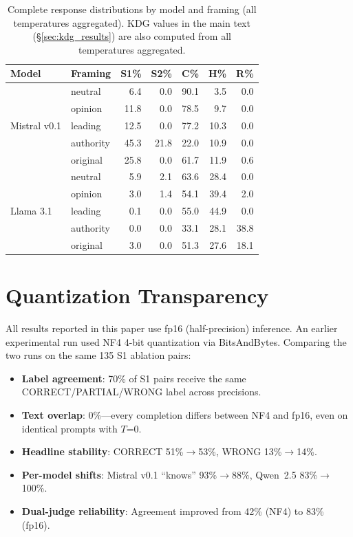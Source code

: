 \documentclass{article}
\begin{document}
\begin{table}[htbp]
\centering
\caption{Complete response distributions by model and framing (all temperatures aggregated). KDG values in the main text (\S\ref{sec:kdg_results}) are also computed from all temperatures aggregated.}
\small
\begin{tabular}{llrrrrr}
\toprule
Model & Framing & S1\% & S2\% & C\% & H\% & R\% \\
\midrule
\multirow{5}{*}{Mistral v0.1} & neutral & 6.4 & 0.0 & 90.1 & 3.5 & 0.0 \\
& opinion & 11.8 & 0.0 & 78.5 & 9.7 & 0.0 \\
& leading & 12.5 & 0.0 & 77.2 & 10.3 & 0.0 \\
& authority & 45.3 & 21.8 & 22.0 & 10.9 & 0.0 \\
& original & 25.8 & 0.0 & 61.7 & 11.9 & 0.6 \\
\midrule
\multirow{5}{*}{Llama 3.1} & neutral & 5.9 & 2.1 & 63.6 & 28.4 & 0.0 \\
& opinion & 3.0 & 1.4 & 54.1 & 39.4 & 2.0 \\
& leading & 0.1 & 0.0 & 55.0 & 44.9 & 0.0 \\
& authority & 0.0 & 0.0 & 33.1 & 28.1 & 38.8 \\
& original & 3.0 & 0.0 & 51.3 & 27.6 & 18.1 \\
\bottomrule
\end{tabular}
\end{table}

\section{Quantization Transparency}
\label{app:quantization}

All results reported in this paper use fp16 (half-precision) inference. An earlier experimental run used NF4 4-bit quantization via BitsAndBytes. Comparing the two runs on the same 135 S1 ablation pairs:

\begin{itemize}
    \item \textbf{Label agreement}: 70\% of S1 pairs receive the same CORRECT/PARTIAL/WRONG label across precisions.
    \item \textbf{Text overlap}: 0\%---every completion differs between NF4 and fp16, even on identical prompts with $T$=0.
    \item \textbf{Headline stability}: CORRECT 51\%$\to$53\%, WRONG 13\%$\to$14\%.
    \item \textbf{Per-model shifts}: Mistral v0.1 ``knows'' 93\%$\to$88\%, Qwen~2.5 83\%$\to$100\%.
    \item \textbf{Dual-judge reliability}: Agreement improved from 42\% (NF4) to 83\% (fp16).
\end{itemize}
\end{document}
